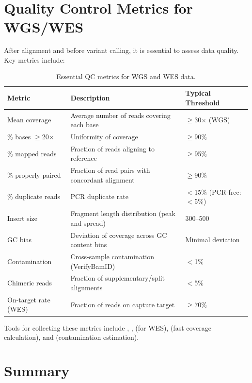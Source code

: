 \section{Quality Control Metrics for WGS/WES}
\label{sec:qc_metrics}

After alignment and before variant calling, it is essential to assess data quality. Key metrics include:

\begin{table}[htbp]
\centering
\caption{Essential QC metrics for WGS and WES data.}
\label{tab:qc_metrics}
\begin{tabularx}{\textwidth}{@{}lXl@{}}
\toprule
\textbf{Metric} & \textbf{Description} & \textbf{Typical Threshold} \\
\midrule
Mean coverage & Average number of reads covering each base & $\geq$30$\times$ (WGS) \\
\% bases $\geq$20$\times$ & Uniformity of coverage & $\geq$90\% \\
\% mapped reads & Fraction of reads aligning to reference & $\geq$95\% \\
\% properly paired & Fraction of read pairs with concordant alignment & $\geq$90\% \\
\% duplicate reads & PCR duplicate rate & $<$15\% (PCR-free: $<$5\%) \\
Insert size & Fragment length distribution (peak and spread) & 300--500\basepair{} \\
GC bias & Deviation of coverage across GC content bins & Minimal deviation \\
Contamination & Cross-sample contamination (VerifyBamID) & $<$1\% \\
Chimeric reads & Fraction of supplementary/split alignments & $<$5\% \\
On-target rate (WES) & Fraction of reads on capture target & $\geq$70\% \\
\bottomrule
\end{tabularx}
\end{table}

Tools for collecting these metrics include , ,  (for WES),  (fast coverage calculation), and  (contamination estimation).

\section{Summary}
\label{sec:ch07_summary}

